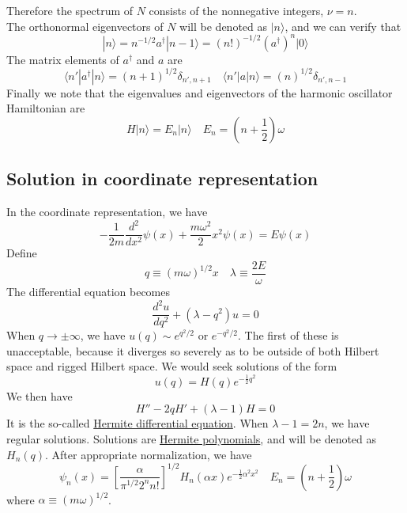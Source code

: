 Therefore the spectrum of $N$ consists of the nonnegative integers, $\nu=n$. \\
The orthonormal eigenvectors of $N$ will be denoted as $|n\rangle$, and we can verify that
\[ |n\rangle = n^{-1/2} a^{\dagger} |n-1\rangle = (n!)^{-1/2} (a^{\dagger})^n |0\rangle\]
The matrix elements of $a^{\dagger}$ and $a$ are
\[\langle n' | a^{\dagger} |n \rangle = (n+1)^{1/2}\delta_{n',n+1} \quad  \langle n' | a |n \rangle = (n)^{1/2}\delta_{n',n-1}\]
Finally we note that the eigenvalues and eigenvectors of the harmonic oscillator Hamiltonian are
\[H |n\rangle = E_n |n\rangle \quad  E_n =(n+\frac{1}{2})\omega\]

\subsection{Solution in coordinate representation}
In the coordinate representation, we have
\[-\frac{1}{2m} \frac{d^2}{dx^2} \psi(x) + \frac{m\omega^2}{2}x^2 \psi(x) = E \psi(x)\]
Define
\[q \equiv (m\omega)^{1/2}x \quad \lambda \equiv \frac{2E}{\omega}\]
The differential equation becomes
\[\frac{d^2u}{dq^2} + (\lambda - q^2)u = 0\]
When $q \to \pm \infty$, we have $u(q) \sim e^{q^2/2}$ or $e^{-q^2/2}$. The first of these is unacceptable, because it
diverges so severely as to be outside of both Hilbert space and rigged Hilbert space. We would seek solutions of the form 
\[u(q) = H(q) e^{-\frac{1}{2}q^2}\]
We then have
\[H'' - 2qH' + (\lambda-1)H = 0\]
It is the so-called \href{http://mathworld.wolfram.com/HermiteDifferentialEquation.html}{Hermite differential equation}. When $\lambda - 1 = 2n$, we have regular solutions. Solutions are \href{http://mathworld.wolfram.com/HermitePolynomial.html}{Hermite polynomials}, and will be denoted as $H_n(q)$. After appropriate normalization, we have
\[\psi_n(x) = \left [ \frac{\alpha}{\pi^{1/2} 2^n n!} \right ]^{1/2} H_n(\alpha x) e^{-\frac{1}{2}\alpha^2 x^2} \quad E_n = (n+\frac{1}{2})\omega\]
where $\alpha \equiv (m\omega)^{1/2}$.

